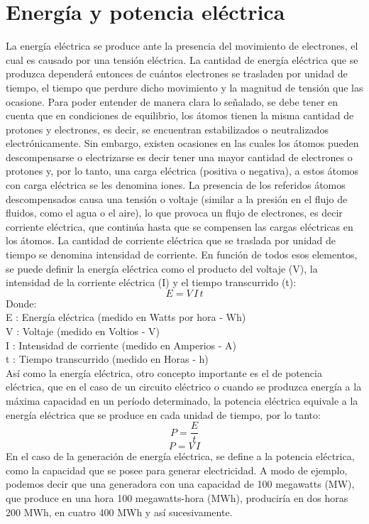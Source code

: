 \documentclass[a4paper,12pt]{report}
\begin{document}
\chapter{Energía y potencia eléctrica}
La energía eléctrica se produce ante la presencia del movimiento de electrones, el cual es causado por una tensión eléctrica. La cantidad de energía eléctrica que se produzca dependerá entonces de cuántos electrones se trasladen por unidad de tiempo, el tiempo que perdure dicho movimiento y la magnitud de tensión que las ocasione. Para poder entender de manera clara lo señalado, se debe tener en cuenta que en condiciones de equilibrio, los átomos tienen la misma cantidad de protones y electrones, es decir, se encuentran estabilizados o neutralizados electrónicamente. Sin embargo, existen ocasiones en las cuales los átomos pueden descompensarse o electrizarse es decir tener una mayor cantidad de electrones o protones y, por lo tanto, una carga eléctrica (positiva o negativa), a estos átomos con carga eléctrica se les denomina iones.
La presencia de los referidos átomos descompensados causa una tensión o voltaje (similar a la presión en el flujo de fluidos, como el agua o el aire), lo que provoca un flujo de electrones, es decir corriente eléctrica, que continúa hasta que se compensen las cargas eléctricas en los átomos. La cantidad de corriente eléctrica que se traslada por unidad de tiempo se denomina intensidad de corriente. En función de todos esos elementos, se puede definir la energía eléctrica como el producto del voltaje (V), la intensidad de la corriente eléctrica (I) y el tiempo transcurrido (t):
$$
E = V\,I\,t
$$
Donde:\\
E : Energía eléctrica (medido en Watts por hora - Wh)\\
V : Voltaje (medido en Voltios - V)\\
I : Intensidad de corriente (medido en Amperios - A)\\
t : Tiempo transcurrido (medido en Horas - h)\\
Así como la energía eléctrica, otro concepto importante es el de potencia eléctrica, que en el caso de un circuito eléctrico o cuando se produzca energía a la máxima capacidad en un período determinado, la potencia eléctrica equivale a la energía eléctrica que se produce en cada unidad de tiempo, por lo tanto:
$$
P = \frac{E}{t}
$$
$$
P = V\, I
$$
En el caso de la generación de energía eléctrica, se define a la potencia eléctrica, como la capacidad que se posee para generar electricidad. A modo de ejemplo, podemos decir que una generadora con una capacidad de 100 megawatts (MW), que produce en una hora 100 megawatts-hora (MWh), produciría en dos horas 200 MWh, en cuatro 400 MWh y así sucesivamente.
\end{document}

